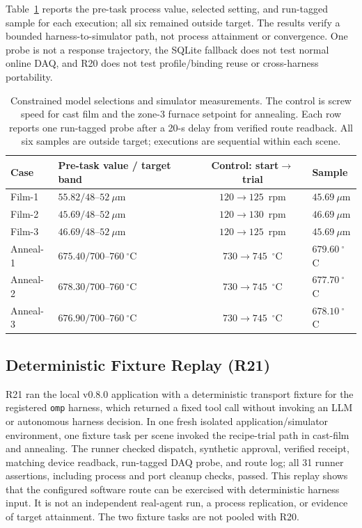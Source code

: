 Table~\ref{tab:q8} reports the pre-task process value, selected setting, and
run-tagged sample for each execution; all six remained outside target. The
results verify a bounded harness-to-simulator path, not process attainment or
convergence. One probe is not a response trajectory, the SQLite fallback does
not test normal online DAQ, and R20 does not test profile/binding reuse or
cross-harness portability.

\begin{table}[!t]
\centering
\caption{Constrained model selections and simulator measurements. The control
is screw speed for cast film and the zone-3 furnace setpoint for annealing.
Each row reports one run-tagged probe after a 20-s delay from verified route
readback. All six samples are outside target; executions are sequential within
each scene.}
\label{tab:q8}
\footnotesize
\setlength{\tabcolsep}{2.5pt}
\begin{tabularx}{\columnwidth}{@{}lXcX@{}}
\toprule
Case & Pre-task value / target band & Control: start$\to$trial & Sample \\
\midrule
Film-1 & $55.82/48$--$52~\mu$m & $120\to125$~rpm & $45.69~\mu$m \\
Film-2 & $45.69/48$--$52~\mu$m & $120\to130$~rpm & $46.69~\mu$m \\
Film-3 & $46.69/48$--$52~\mu$m & $120\to125$~rpm & $45.69~\mu$m \\
Anneal-1 & $675.40/700$--$760~^{\circ}$C & $730\to745$~$^{\circ}$C & $679.60~^{\circ}$C \\
Anneal-2 & $678.30/700$--$760~^{\circ}$C & $730\to745$~$^{\circ}$C & $677.70~^{\circ}$C \\
Anneal-3 & $676.90/700$--$760~^{\circ}$C & $730\to745$~$^{\circ}$C & $678.10~^{\circ}$C \\
\bottomrule
\end{tabularx}
\end{table}

\subsection{Deterministic Fixture Replay (R21)}
R21 ran the local v0.8.0 application with a deterministic transport fixture
for the registered \texttt{omp} harness,
which returned a fixed tool call without invoking an LLM or autonomous harness
decision. In one fresh isolated application/simulator environment, one fixture
task per scene invoked the recipe-trial path in cast-film and annealing. The
runner checked dispatch, synthetic approval, verified receipt, matching device
readback, run-tagged DAQ probe, and route log; all 31 runner assertions,
including process and port cleanup checks, passed. This replay shows that the
configured software route can be exercised with deterministic harness input.
It is not an independent real-agent run, a process replication, or evidence of
target attainment. The two fixture tasks are not pooled with R20.

